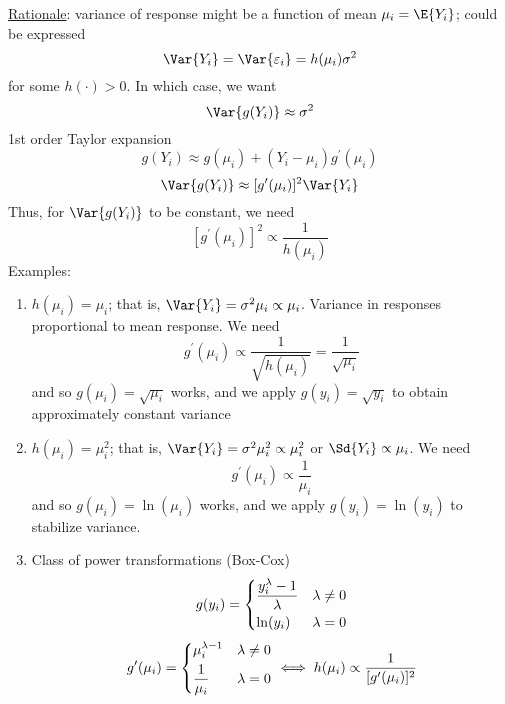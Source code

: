 \begin{enumerate}[label=(\arabic*)]
            \underline{Rationale}: variance of response might be a function
            of mean $ \mu_i=\E{Y_i} $; could be expressed
            \[ \Var{Y_i}=\Var{\varepsilon_i}=h(\mu_i)\sigma^2 \]
            for some $ h(\cdot)>0 $. In which case, we want
            \[ \Var{g(Y_i)}\approx \sigma^2 \]
            1st order Taylor expansion
            \[ g(Y_i)\approx g(\mu_i)+(Y_i-\mu_i)g^\prime(\mu_i) \]
            \[ \Var{g(Y_i)}\approx [g^\prime(\mu_i)]^2\Var{Y_i} \]
            Thus, for $ \Var{g(Y_i)} $ to be constant, we need
            \[ [g^\prime(\mu_i)]^2\propto \frac{1}{h(\mu_i)} \]
            Examples:
            \begin{enumerate}[label=(\roman*)]
                  \item $ h(\mu_i)=\mu_i $; that is,
                        $ \Var{Y_i}=\sigma^2 \mu_i\propto \mu_i $.
                        Variance in responses proportional to mean response.
                        We need
                        \[ g^\prime(\mu_i)\propto \frac{1}{\sqrt{h(\mu_i)}}=
                              \frac{1}{\sqrt{\mu_i}} \]
                        and so $ g(\mu_i)=\sqrt{\mu_i} $ works,
                        and we apply $ g(y_i)=\sqrt{y_i} $
                        to obtain approximately constant variance
                  \item $ h(\mu_i)=\mu_i^2 $; that is,
                        $ \Var{Y_i}=\sigma^2\mu_i^2 \propto \mu_i^2 $
                        or
                        $ \Sd{Y_i}\propto \mu_i $.
                        We need
                        \[ g^\prime(\mu_i)\propto\frac{1}{\mu_i} \]
                        and so $ g(\mu_i)=\ln(\mu_i) $ works, and we apply
                        $ g(y_i)=\ln(y_i) $
                        to stabilize variance.
                  \item Class of power transformations (Box-Cox)
                        \[ g(y_i)=\begin{dcases}
                                    \frac{y_i^\lambda -1}{\lambda} & \lambda\neq 0 \\
                                    \ln(y_i)                       & \lambda=0
                              \end{dcases} \]
                        \[ g^\prime(\mu_i)=\begin{dcases}
                                    \mu_i^{\lambda-1} & \lambda\neq 0 \\
                                    \frac{1}{\mu_i}   & \lambda=0
                              \end{dcases}\iff h(\mu_i)\propto \frac{1}{[g^\prime(\mu_i)]^2}
\]
\end{enumerate}
\end{enumerate}
